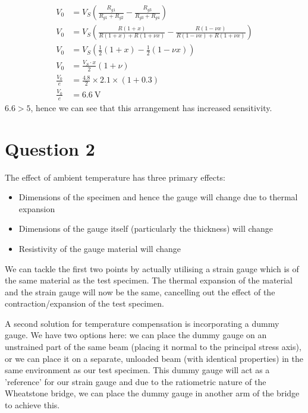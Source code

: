 \documentclass[12pt]{article}
\numberwithin{equation}{section}
\begin{document}
\begin{align}
  V_0 &= V_S \left(\frac{R_{g1}}{R_{g1} + R_{g2}} - \frac{R_{g3}}{R_{g3} + R_{g4}}\right)\\
  V_0 &= V_S \left(\frac{R(1+x)}{R(1+x) + R(1+\nu x)} - \frac{R(1-\nu x)}{R(1-\nu x) + R(1+\nu x)}\right)\\
  V_0 &= V_S \left(\frac{1}{2}(1+x) - \frac{1}{2}(1-\nu x)\right)\\
  V_0 &= \frac{V_S \cdot x}{2} \left(1 + \nu \right)\\
  \frac{V_0}{e} &= \frac{4.8}{2} \times 2.1\times  (1 + 0.3)\\
  \frac{V_0}{e} &= \SI{6.6}{\volt}
\end{align}
$6.6 > 5$, hence we can see that this arrangement has increased sensitivity.
\section{Question 2}
The effect of ambient temperature has three primary effects:
\begin{itemize}
  \item Dimensions of the specimen and hence the gauge will change due to thermal expansion
  \item Dimensions of the gauge itself (particularly the thickness) will change
  \item Resistivity of the gauge material will change
\end{itemize}
We can tackle the first two points by actually utilising a strain gauge which is of the same material as the test specimen. The thermal expansion of the material and the strain gauge will now be the same, cancelling out the effect of the contraction/expansion of the test specimen.

A second solution for temperature compensation is incorporating a dummy gauge. We have two options here: we can place the dummy gauge on an unstrained part of the same beam (placing it normal to the principal stress axis), or we can place it on a separate, unloaded beam (with identical properties) in the same environment as our test specimen. This dummy gauge will act as a 'reference' for our strain gauge and due to the ratiometric nature of the Wheatstone bridge, we can place the dummy gauge in another arm of the bridge to achieve this. 
\end{document}
